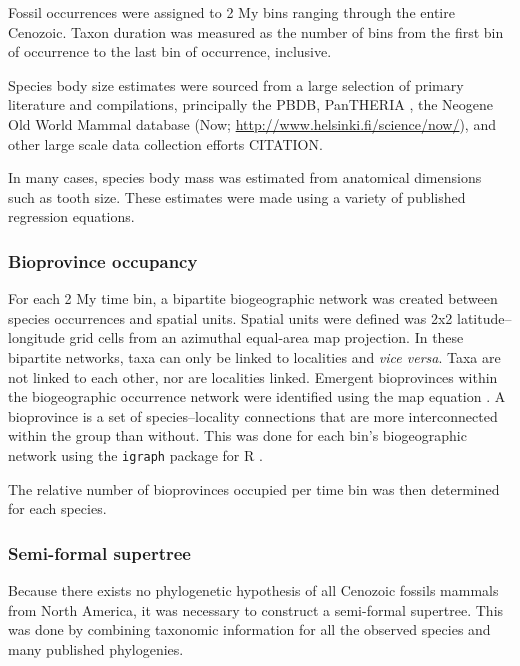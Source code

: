 \documentclass[12pt,letterpaper]{article}
\begin{document}
Fossil occurrences were assigned to 2 My bins ranging through the entire Cenozoic. Taxon duration was measured as the number of bins from the first bin of occurrence to the last bin of occurrence, inclusive.

Species body size estimates were sourced from a large selection of primary literature and compilations, principally the PBDB, PanTHERIA \citep{Jones2009c}, the Neogene Old World Mammal database (Now; \url{http://www.helsinki.fi/science/now/}), and other large scale data collection efforts \citep{Smith2004c, Raia2012f, Brook2004a, Freudenthal2013, McKenna2011} CITATION. %

In many cases, species body mass was estimated from anatomical dimensions such as tooth size. These estimates were made using a variety of published regression equations. %


\subsubsection{Bioprovince occupancy}

For each 2 My time bin, a bipartite biogeographic network was created between species occurrences and spatial units. Spatial units were defined was 2x2 latitude--longitude grid cells from an azimuthal equal-area map projection. In these bipartite networks, taxa can only be linked to localities and \textit{vice versa}. Taxa are not linked to each other, nor are localities linked. Emergent bioprovinces within the biogeographic occurrence network were identified using the map equation \citep{Rosvall2008,Rosvall2009a}. A bioprovince is a set of species--locality connections that are more interconnected within the group than without. This was done for each bin's biogeographic network using the \texttt{igraph} package for R \citep{csardi2006igraph,2014language}. 

The relative number of bioprovinces occupied per time bin was then determined for each species. %


\subsubsection{Semi-formal supertree}

Because there exists no phylogenetic hypothesis of all Cenozoic fossils mammals from North America, it was necessary to construct a semi-formal supertree. This was done by combining taxonomic information for all the observed species and many published phylogenies.
\end{document}

